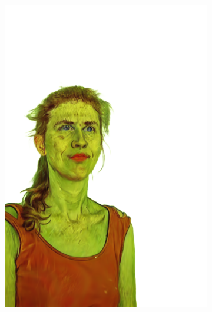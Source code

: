 \begin{figure}[ht]
\begin{subfigure}{0.08\linewidth}
        \includegraphics[width=\textwidth]{Figures/results/low/dora_vangogh/11_render.png}

\end{subfigure}
\end{figure}

